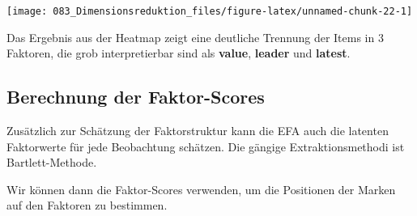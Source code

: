 \documentclass[12pt,]{book}
\newenvironment{Shaded}{\begin{snugshade}}{\end{snugshade}}
\newcommand{\KeywordTok}[1]{\textcolor[rgb]{0.13,0.29,0.53}{\textbf{{#1}}}}
\newcommand{\DataTypeTok}[1]{\textcolor[rgb]{0.13,0.29,0.53}{{#1}}}
\newcommand{\DecValTok}[1]{\textcolor[rgb]{0.00,0.00,0.81}{{#1}}}
\newcommand{\StringTok}[1]{\textcolor[rgb]{0.31,0.60,0.02}{{#1}}}
\newcommand{\CommentTok}[1]{\textcolor[rgb]{0.56,0.35,0.01}{\textit{{#1}}}}
\newcommand{\NormalTok}[1]{{#1}}
\begin{document}
\begin{Shaded}
\end{Shaded}

\begin{center}\texttt{[image: 083\_Dimensionsreduktion\_files/figure-latex/unnamed-chunk-22-1]} \end{center}

Das Ergebnis aus der Heatmap zeigt eine deutliche Trennung der Items in
3 Faktoren, die grob interpretierbar sind als \textbf{value},
\textbf{leader} und \textbf{latest}.

\subsection{Berechnung der
Faktor-Scores}\label{berechnung-der-faktor-scores}

Zusätzlich zur Schätzung der Faktorstruktur kann die EFA auch die
latenten Faktorwerte für jede Beobachtung schätzen. Die gängige
Extraktionsmethodi ist Bartlett-Methode.

\begin{Shaded}
\end{Shaded}

Wir können dann die Faktor-Scores verwenden, um die Positionen der
Marken auf den Faktoren zu bestimmen.
\end{document}
